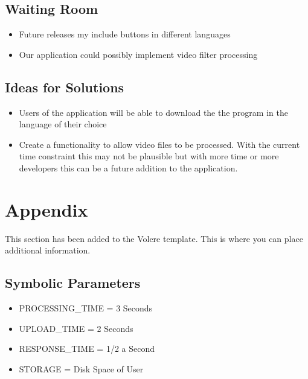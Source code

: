 \documentclass[12pt, titlepage]{article}
\begin{document}
\subsection{Waiting Room}

\begin{itemize}	
\item Future releases my include buttons in different languages\\
\item Our application could possibly implement video filter  processing\\
\end{itemize}

\subsection{Ideas for Solutions}

\begin{itemize}
\item Users of the application will be able to download the the program in the language of their choice
\item Create a functionality to allow video files to be processed. With the current time constraint this may not be plausible but with more time or more developers this can be a future addition to the application.
\end{itemize}







\newpage

\section{Appendix}

This section has been added to the Volere template.  This is where you can place
additional information.

\subsection{Symbolic Parameters}

\begin{itemize}
\item PROCESSING\_TIME = 3 Seconds
\item UPLOAD\_TIME = 2 Seconds
\item RESPONSE\_TIME = 1/2 a Second
\item STORAGE = Disk Space of User
\end{itemize}
\end{document}
